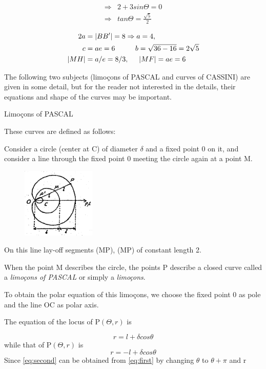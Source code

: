 \documentclass[11pt]{amsbook}
\begin{document}


\begin{align*}
	\Rightarrow & 2 + 3 sin \Theta  = 0      \\
	\Rightarrow & tan \Theta = \frac{\sqrt{5}}{2} 
\end{align*}

\begin{align*}
     2a &  = \left | BB' \right | = 8 \Rightarrow a = 4, \\ 
     c  &  = ae = 6 \hspace{1cm} b = \sqrt {36 - 16} = 2\sqrt 5 \\
    \left | MH \right |& = a/e = 8/3, \hspace{0.5cm} \left | MF \right | = ae = 6
\end{align*}

 
 
The following two subjects (limo\c{c}ons of PASCAL and curves of CASSINI) are given in some detail, but for the reader not interested in the details, their equations and shape of the curves may be important.


Limo\c{c}ons of PASCAL


These curves are defined as follows: 


Consider a circle (center at C) of diameter $\delta$ and a fixed point 0 on it, and consider a line through the fixed point 0 meeting the circle again at a point M.
\begin{figure}
\includegraphics[width=3.5cm]{images/b1p2-315.png}
\end{figure} 
On this line lay-off segments (MP), (MP\textquotesingle) of constant length 2.


When the point M describes the circle, the points P describe a closed curve called a \textit{limo\c{c}ons of PASCAL} or simply a \textit{limo\c{c}ons}.


To obtain the polar equation of this limo\c{c}ons, we choose the fixed point 0 as pole and the line OC as polar axis.


The equation of the locus of P$\left ( \Theta , r \right )$ is


\begin{equation}\tag{1}
\label{eq:first}
r = l  + \delta cos\theta 
\end{equation}
while that of P\textquotesingle $ \left ( \Theta , r \right )  $ is 
\begin{equation}\tag{1'}
\label{eq:second}
r = - l  + \delta cos\theta
\end{equation}
Since \eqref{eq:second} can be obtained from \eqref{eq:first} by changing $\theta$ to $\theta + \pi$ and r
\end{document}
